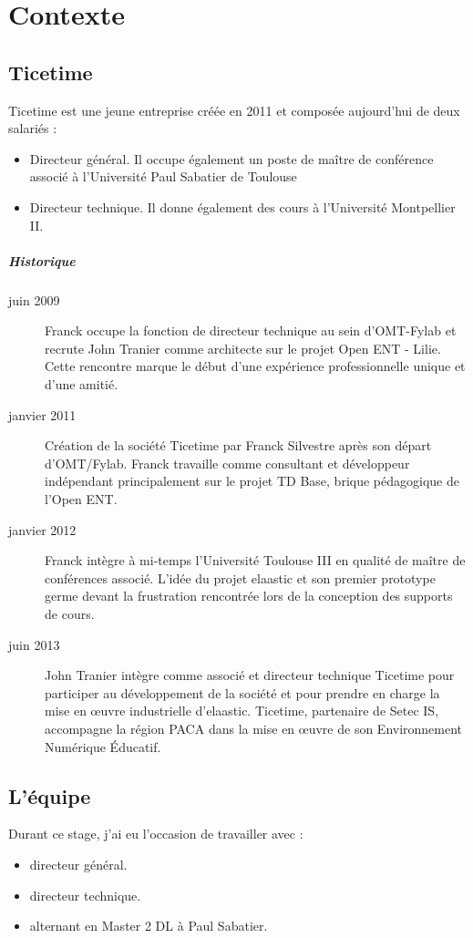 \chapter{Contexte}
\section{Ticetime}
\newcommand{\ticetime}[2]{\item[{\it #1}] #2}
Ticetime est une jeune entreprise créée en 2011 et composée aujourd'hui de deux salariés :
\begin{itemize}
  \ticetime{Franck Silvestre}{Directeur général. Il occupe également
  un poste de maître de conférence associé à l'Université Paul Sabatier de
  Toulouse}
  \ticetime{John Tranier}{Directeur technique. Il donne également des cours à
  l'Université Montpellier II.}
\end{itemize}

\paragraph{Historique}
\begin{description}
  \item[juin 2009] Franck occupe la fonction de directeur technique au sein
	d'OMT-Fylab et recrute John Tranier comme architecte sur le projet Open ENT
	- Lilie. Cette rencontre marque le début d'une expérience professionnelle
	unique et d'une amitié.
  \item[janvier 2011] Création de la société Ticetime par Franck Silvestre après
	son départ d'OMT/Fylab. Franck travaille comme consultant et développeur
	indépendant principalement sur le projet TD Base, brique pédagogique de
	l'Open ENT.
  \item[janvier 2012] Franck intègre à mi-temps l'Université Toulouse III en
	qualité de maître de conférences associé. L'idée du projet elaastic et son
	premier prototype germe devant la frustration rencontrée lors de la
	conception des supports de cours.
  \item[juin 2013] John Tranier intègre comme associé et directeur technique
	Ticetime pour participer au développement de la société et pour prendre en
	charge la mise en \oe uvre industrielle d'elaastic. Ticetime, partenaire de
	Setec IS, accompagne la région PACA dans la mise en \oe uvre de son
	Environnement Numérique Éducatif.
\end{description}
\section{L'équipe}
Durant ce stage, j'ai eu l'occasion de travailler avec :\\
\begin{itemize}
  \ticetime{Franck Silvestre}{directeur général.}
  \ticetime{John Tranier}{directeur technique.}
  \ticetime{Vincent Tertre}{alternant en Master 2 DL à Paul Sabatier.}
\end{itemize}
